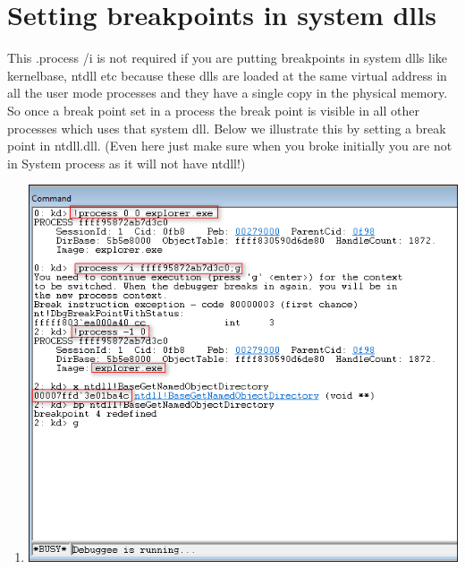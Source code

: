 \documentclass{article}
\begin{document}
\section{Setting breakpoints in system dlls}
This .process /i is not required if you are putting breakpoints in system dlls like kernelbase, ntdll etc because these dlls are loaded at the same virtual address in all the user mode processes and they have a single copy in the physical memory. So once a break point set in a process the break point is visible in all other processes which uses that system dll. Below we illustrate this by setting a break point in ntdll.dll. (Even here just make sure when you broke initially you are not in System process as it will not have ntdll!)
\begin{enumerate}[noitemsep]
    \item
    \begin{minipage}{\linewidth}
    \includegraphics[width=\linewidth]{UsermodeBreakPointFromKD4.png}
    \end{minipage}


\end{enumerate}
\end{document}
